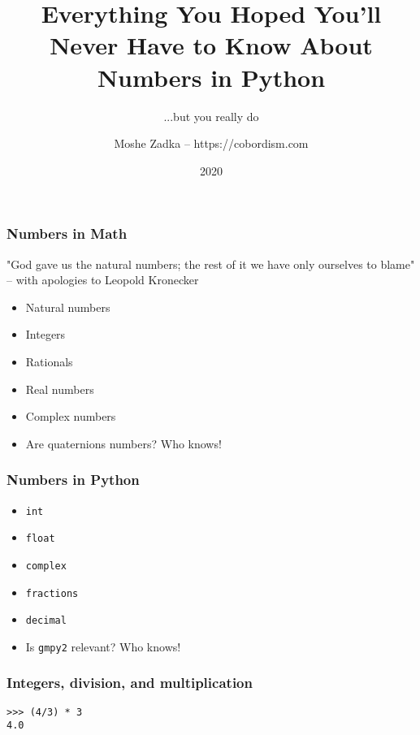 \usepackage{listings}
\usepackage{textcomp}
\usepackage{fancyvrb}

\title{Everything You Hoped You'll Never Have to Know About Numbers in Python}
\subtitle{...but you really do}
\author{Moshe Zadka -- https://cobordism.com}
\date{2020}


\begin{titlepage}
\maketitle
\end{titlepage}

\frame{\titlepage}

\begin{frame}
\frametitle{Numbers in Math}
"God gave us the natural numbers;
the rest of it we have only ourselves to blame" --
with apologies to Leopold Kronecker

\begin{itemize}
\item Natural numbers
\item Integers
\item Rationals
\item Real numbers
\item Complex numbers
\item Are quaternions numbers? Who knows!
\end{itemize}

\begin{frame}[fragile]
\frametitle{Numbers in Python}

\begin{itemize}
\item \texttt{int}
\item \texttt{float}
\item \texttt{complex}
\item \texttt{fractions}
\item \texttt{decimal}
\item Is \texttt{gmpy2} relevant? Who knows!
\end{itemize}

\end{frame}

\begin{frame}[fragile]
\frametitle{Integers, division, and multiplication}

\begin{lstlisting}
>>> (4/3) * 3
4.0
\end{lstlisting}
\end{frame}


\end{frame}
